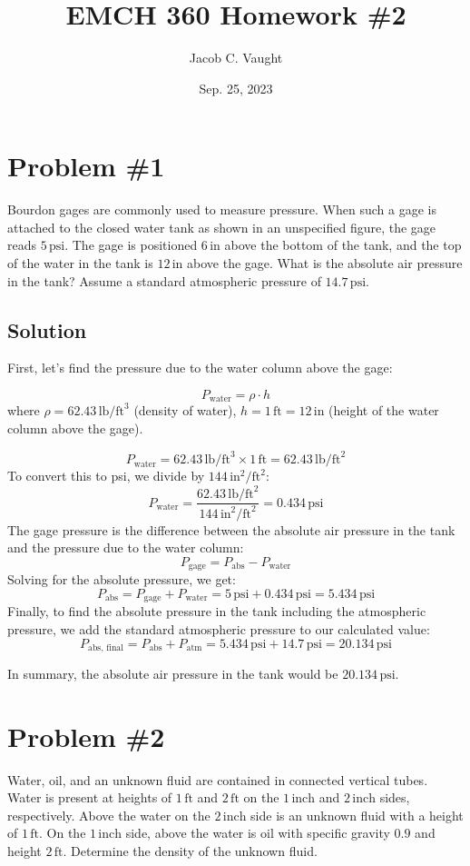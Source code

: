 \documentclass[12pt]{article}
\title{EMCH 360 Homework \#2}
\author{Jacob C. Vaught}
\date{Sep. 25, 2023}
\begin{document}
\maketitle
\section*{Problem \#1}
Bourdon gages are commonly used to measure pressure. When such a gage is attached to the closed water tank as shown in an unspecified figure, the gage reads \(5 \, \text{psi}\). The gage is positioned \(6 \, \text{in}\) above the bottom of the tank, and the top of the water in the tank is \(12 \, \text{in}\) above the gage. What is the absolute air pressure in the tank? Assume a standard atmospheric pressure of \(14.7 \, \text{psi}\).

\subsection*{Solution}
First, let's find the pressure due to the water column above the gage:

\[
P_{\text{water}} = \rho \cdot h
\]
where  
\(\rho = 62.43 \, \text{lb/ft}^3\) (density of water),  
\(h = 1 \, \text{ft} = 12 \, \text{in}\) (height of the water column above the gage).

\[
P_{\text{water}} = 62.43 \, \text{lb/ft}^3 \times 1 \, \text{ft} = 62.43 \, \text{lb/ft}^2
\]
To convert this to psi, we divide by \(144 \, \text{in}^2/\text{ft}^2\):
\[
P_{\text{water}} = \frac{62.43 \, \text{lb/ft}^2}{144 \, \text{in}^2/\text{ft}^2} = 0.434 \, \text{psi}
\]
The gage pressure is the difference between the absolute air pressure in the tank and the pressure due to the water column:
\[
P_{\text{gage}} = P_{\text{abs}} - P_{\text{water}}
\]
Solving for the absolute pressure, we get:
\[
P_{\text{abs}} = P_{\text{gage}} + P_{\text{water}} = 5 \, \text{psi} + 0.434 \, \text{psi} = 5.434 \, \text{psi}
\]
Finally, to find the absolute pressure in the tank including the atmospheric pressure, we add the standard atmospheric pressure to our calculated value:
\[
P_{\text{abs, final}} = P_{\text{abs}} + P_{\text{atm}} = 5.434 \, \text{psi} + 14.7 \, \text{psi} = 20.134 \, \text{psi}
\]

In summary, the absolute air pressure in the tank would be \(20.134 \, \text{psi}\).


\newpage
\section*{Problem \#2}
Water, oil, and an unknown fluid are contained in connected vertical tubes. Water is present at heights of \(1 \, \text{ft}\) and \(2 \, \text{ft}\) on the \(1 \, \text{inch}\) and \(2 \, \text{inch}\) sides, respectively. Above the water on the \(2 \, \text{inch}\) side is an unknown fluid with a height of \(1 \, \text{ft}\). On the \(1 \, \text{inch}\) side, above the water is oil with specific gravity \(0.9\) and height \(2 \, \text{ft}\). Determine the density of the unknown fluid.
\end{document}
